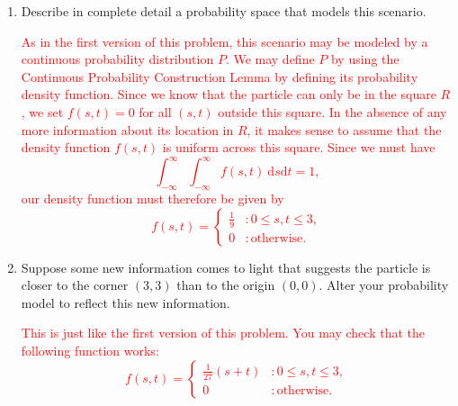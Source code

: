 \documentclass[12pt,reqno]{amsart}
\begin{document}
\medskip
\begin{enumerate}
\item Describe in complete detail a probability space that models this scenario.

\bigskip
\textcolor{red}{As in the first version of this problem, this scenario may be modeled by a continuous probability distribution $P$. We may define $P$ by using the Continuous Probability Construction Lemma by defining its probability density function. Since we know that the particle can only be in the square $R$, we set $f(s,t)=0$ for all $(s,t)$ outside this square. In the absence of any more information about its location in $R$, it makes sense to assume that the density function $f(s,t)$ is uniform across this square. Since we must have
	\[
	\int_{-\infty}^\infty \int_{-\infty}^\infty f(s,t) \ \text{d} s \text{d}t =1,
	\]
our density function must therefore be given by
	\[
	f(s,t) = \begin{cases} \frac{1}{9} & : 0 \leq s,t \leq 3, \\
	0 & : \text{otherwise}.\end{cases}
	\]}
\bigskip

\item Suppose some new information comes to light that suggests the particle is closer to the corner $(3,3)$ than to the origin $(0,0)$. Alter your probability model to reflect this new information.
    
\bigskip
\textcolor{red}{This is just like the first version of this problem. You may check that the following function works:
        \[
        f(s,t) = \begin{cases}
	\frac{1}{27}(s+t) & : 0 \leq s,t \leq 3, \\
	0 & : \text{otherwise}.
	\end{cases}
	\]}
\end{enumerate}
\end{document}
